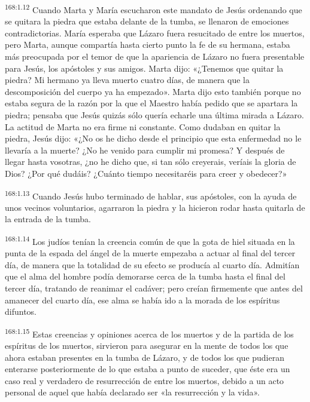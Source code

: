\par 
\textsuperscript{168:1.12} Cuando Marta y María escucharon este mandato de Jesús ordenando que se quitara la piedra que estaba delante de la tumba, se llenaron de emociones contradictorias. María esperaba que Lázaro fuera resucitado de entre los muertos, pero Marta, aunque compartía hasta cierto punto la fe de su hermana, estaba más preocupada por el temor de que la apariencia de Lázaro no fuera presentable para Jesús, los apóstoles y sus amigos. Marta dijo: «¿Tenemos que quitar la piedra? Mi hermano ya lleva muerto cuatro días, de manera que la descomposición del cuerpo ya ha empezado». Marta dijo esto también porque no estaba segura de la razón por la que el Maestro había pedido que se apartara la piedra; pensaba que Jesús quizás sólo quería echarle una última mirada a Lázaro. La actitud de Marta no era firme ni constante. Como dudaban en quitar la piedra, Jesús dijo: «¿No os he dicho desde el principio que esta enfermedad no le llevaría a la muerte? ¿No he venido para cumplir mi promesa? Y después de llegar hasta vosotras, ¿no he dicho que, si tan sólo creyerais, veríais la gloria de Dios? ¿Por qué dudáis? ¿Cuánto tiempo necesitaréis para creer y obedecer?»

\par 
\textsuperscript{168:1.13} Cuando Jesús hubo terminado de hablar, sus apóstoles, con la ayuda de unos vecinos voluntarios, agarraron la piedra y la hicieron rodar hasta quitarla de la entrada de la tumba.

\par 
\textsuperscript{168:1.14} Los judíos tenían la creencia común de que la gota de hiel situada en la punta de la espada del ángel de la muerte empezaba a actuar al final del tercer día, de manera que la totalidad de su efecto se producía al cuarto día. Admitían que el alma del hombre podía demorarse cerca de la tumba hasta el final del tercer día, tratando de reanimar el cadáver; pero creían firmemente que antes del amanecer del cuarto día, ese alma se había ido a la morada de los espíritus difuntos.

\par 
\textsuperscript{168:1.15} Estas creencias y opiniones acerca de los muertos y de la partida de los espíritus de los muertos, sirvieron para asegurar en la mente de todos los que ahora estaban presentes en la tumba de Lázaro, y de todos los que pudieran enterarse posteriormente de lo que estaba a punto de suceder, que éste era un caso real y verdadero de resurrección de entre los muertos, debido a un acto personal de aquel que había declarado ser «la resurrección y la vida».

